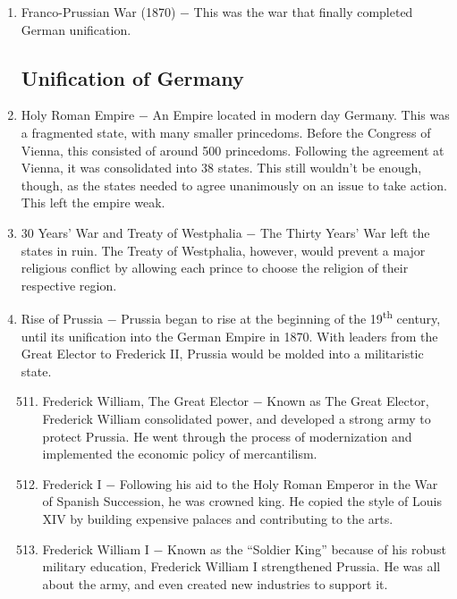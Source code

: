 \documentclass[12pt]{article}
\begin{document}
\begin{enumerate}
\item Franco-Prussian War (1870) $-$ This was the war that finally completed German unification.

\subsection{Unification of Germany}

\item Holy Roman Empire $-$ An Empire located in modern day Germany. This was a fragmented state, with many smaller princedoms. Before the Congress of Vienna, this consisted of around 500 princedoms. Following the agreement at Vienna, it was consolidated into 38 states. This still wouldn't be enough, though, as the states needed to agree unanimously on an issue to take action. This left the empire weak.

\item 30 Years' War and Treaty of Westphalia $-$ The Thirty Years' War left the states in ruin. The Treaty of Westphalia, however, would prevent a major religious conflict by allowing each prince to choose the religion of their respective region.

\item Rise of Prussia $-$ Prussia began to rise at the beginning of the 19\textsuperscript{th} century, until its unification into the German Empire in 1870. With leaders from the Great Elector to Frederick II, Prussia would be molded into a militaristic state. 

\begin{enumerate}[label=\arabic{*}.]
\setcounter{enumii}{510}

\item Frederick William, The Great Elector $-$ Known as The Great Elector, Frederick William consolidated power, and developed a strong army to protect Prussia. He went through the process of modernization and implemented the economic policy of mercantilism.

\item Frederick I $-$ Following his aid to the Holy Roman Emperor in the War of Spanish Succession, he was crowned king. He copied the style of Louis XIV by building expensive palaces and contributing to the arts.

\item Frederick William I $-$ Known as the ``Soldier King'' because of his robust military education, Frederick William I strengthened Prussia. He was all about the army, and even created new industries to support it. 


\end{enumerate}
\end{enumerate}
\end{document}
